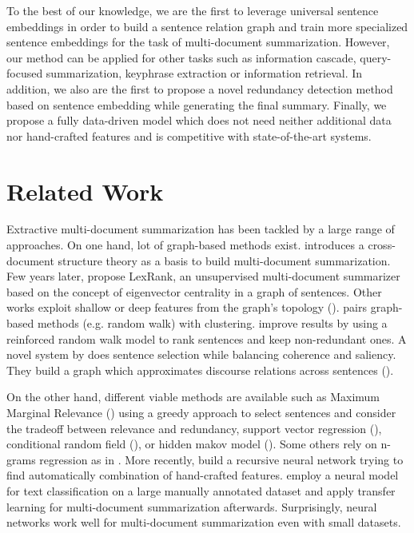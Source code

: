 \documentclass{article}
\begin{document}
To the best of our knowledge, we are the first to leverage universal sentence embeddings in order to build a sentence relation graph and train more specialized sentence embeddings for the task of multi-document summarization. However, our method can be applied for other tasks such as information cascade, query-focused summarization, keyphrase extraction or information retrieval. In addition, we also are the first to propose a novel redundancy detection method based on sentence embedding while generating the final summary. Finally, we propose a fully data-driven model which does not need neither additional data nor hand-crafted features and is competitive with state-of-the-art systems.


\section{Related Work}
\label{sec:related_work}
Extractive multi-document summarization has been tackled by a large range of approaches. On one hand, lot of graph-based methods exist. \citet{Radev2000} introduces a cross-document structure theory as a basis to build multi-document summarization. Few years later, \citet{Erkan2004} propose LexRank, an unsupervised multi-document summarizer based on the concept of eigenvector centrality in a graph of sentences. Other works exploit shallow or deep features from the graph's topology (\citet{Mihalcea_alanguage, Wan2006, ANTIQUEIRA2009584}). \citet{Wan2008} pairs graph-based methods (e.g. random walk) with clustering. \citet{Mei20101} improve results by using a reinforced random walk model to rank sentences and keep non-redundant ones. A novel system by \citet{christensen2013towards} does sentence selection while balancing coherence and saliency. They build a graph which approximates discourse relations across sentences (\citet{mann88b}).%

On the other hand, different viable methods are available such as Maximum Marginal Relevance (\citet{Carbonell1998}) using a greedy approach to select sentences and consider the tradeoff between relevance and redundancy, support vector regression (\citet{li2007multi}), conditional random field (\citet{Galley2006}), or hidden makov model (\citet{conroy2004left}). Some others rely on n-grams regression as in \citet{hong2014improving, li2013using, Conroy2006}. More recently, \citet{cao2015ranking} build a recursive neural network trying to find automatically combination of hand-crafted features. \citet{CaoLLW17} employ a neural model for text classification on a large manually annotated dataset and apply transfer learning for multi-document summarization afterwards. Surprisingly, neural networks work well for multi-document summarization even with small datasets.
\end{document}
